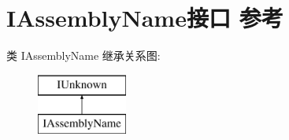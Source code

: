 \hypertarget{interface_i_assembly_name}{}\section{I\+Assembly\+Name接口 参考}
\label{interface_i_assembly_name}
类 I\+Assembly\+Name 继承关系图\+:\begin{figure}[H]
\begin{center}
\leavevmode
\includegraphics[height=2.000000cm]{interface_i_assembly_name}
\end{center}
\end{figure}
